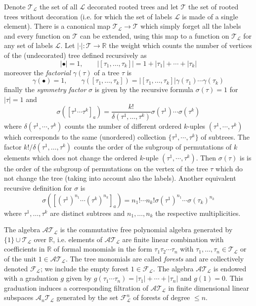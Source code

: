 \documentclass[a4paper]{article}
\newcommand{\1}{{\bf 1}}
\newcommand{\RR}{\mathbb{R}}
\newcommand{\FF}{\mathcal{F}}
\newcommand{\LL}{\mathcal{L}}
\newcommand{\cl}{\mathcal L}
\newcommand{\TT}{\mathcal{T}}
\newcommand{\cA}{\mathcal{A}}
\newcommand{\RR}{\mathbb{R}}
\begin{document}
Denote $\TT_\cl$ the set of all $\cl$
decorated rooted trees and let $\TT$ the set of rooted trees without
decoration (i.e. for which the set of labels $\cl$ is made of a single
element). There is a canonical map $\TT_\cl \to \TT$ which simply
forget all the labels and every function on $\TT$ can be extended,
using this map to a function on $\TT_\cl$ for any set of labels
$\cl$. 
Let $|\cdot| : \TT \to \RR$ the weight which counts the
number of vertices of the (undecorated) tree defined recursively as
$$
|\bullet | = 1, \qquad |[\tau_1,\dots,\tau_k]| = 1+|\tau_1|+\cdots+|\tau_k|
$$
moreover the \emph{factorial} $\gamma(\tau)$ of a tree $\tau$ is
$$
\gamma(\bullet) = 1, \qquad \gamma([\tau_1,\dots,\tau_k]) =
|[\tau_1,\dots,\tau_k]| \gamma(\tau_1) \cdots \gamma(\tau_k)
$$
finally the \emph{symmetry factor} $\sigma$ is given by the
recursive formula $\sigma(\tau) = 1$ for $|\tau| = 1$ and
\begin{equation}
  \label{eq:sigma-prop}
\sigma([\tau^1 \cdots \tau^k]_a) = \frac{k!}{\delta(\tau^1,\dots,\tau^k)} \sigma(\tau^1) \cdots \sigma(\tau^k)  
\end{equation}
where $\delta(\tau^1,\cdots,\tau^{k})$ counts the number of different ordered $k$-uples $(\tau^1,\cdots,\tau^{k})$ which corresponds to the same (unordered) collection  $\{\tau^1,\cdots,\tau^{k}\}$ of subtrees.
The factor $k!/\delta(\tau^1,\dots,\tau^k)$ counts the order of the
subgroup of permutations of $k$ elements which does not change the
ordered $k$-uple $(\tau^1,\cdots,\tau^{k})$. Then $\sigma(\tau)$ is
 is the order of the subgroup of permutations on the vertex of
the tree $\tau$ which do not change the tree (taking into account also
the labels). Another equivalent recursive definition for $\sigma$ is
$$
\sigma([(\tau^1)^{n_1}\cdots(\tau^k)^{n_k}]_a) = n_1!\cdots n_k!
\sigma(\tau^1)^{n_1}\cdots \sigma(\tau_k)^{n_k}
$$
where $\tau^1,\dots,\tau^k$ are distinct subtrees and $n_1,\dots,n_k$
the respective multiplicities.


The algebra $\cA \TT_\cl$ is the commutative free polynomial algebra
generated by $\{1\}\cup \TT_\cl$ over $\RR$, i.e. elements of $\cA \TT_\cl$ are
finite linear combination with coefficients in $\RR$ of formal monomials in the form $\tau_1
\tau_2 \cdots \tau_n$ with $\tau_1,\dots,\tau_n \in \TT_\cl$ or of the
unit $1\in \cA\TT_\cl$. The tree monomials are called \emph{forests} and
are collectively denoted $\FF_\cl$; we include the empty forest $1 \in
\FF_\LL$.
 The algebra $\cA \TT_\cl$
 is endowed with a graduation $g$ given  by $g(\tau_1
\cdots \tau_n) = |\tau_1|+\cdots+|\tau_n|$ and $g(1) = 0$. This graduation induces a
corresponding filtration of $\cA \TT_\cl$ in finite dimensional linear
subspaces $\cA_n \TT_\cl$ generated by the set $\FF_\cl^n$ of forests of degree $\le n$.
\end{document}
